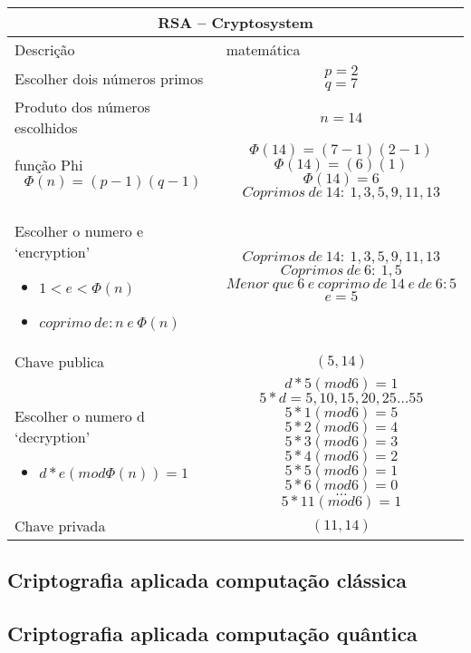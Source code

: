 \vspace{1cm}
\begin{longtable}{ |p{6cm}|| p{8cm}|  }
  \hline
  \multicolumn{2}{|c|}{RSA – Cryptosystem} \\
  \hline
    Descrição & matemática\\
  \hline
    Escolher dois números primos & 
    \[p=2\] \[q=7\]\\
  \hline
    Produto dos números escolhidos & 
    \[n=14\]\\
  \hline
    função Phi 
    \[\Phi(n)=(p-1)(q-1)\] & 
    \[\Phi(14)=(7-1)(2-1)\]
    \[\Phi(14)=(6)(1)\]
    \[\Phi(14)=6\]
    \[Coprimos\: de\: 14:\: 1, 3, 5, 9, 11, 13\]\\
  \hline
    Escolher o numero e `encryption'
    \begin{itemize}
      \item $1 < e < \Phi(n)$
      \item $coprimo\: de: n\: e\: \Phi(n)$
    \end{itemize} &
    \[Coprimos\: de\: 14:\: 1, 3, 5, 9, 11, 13\]
    \[Coprimos\: de\: 6:\: 1, 5\]
    \[Menor\: que\: 6\: e\: coprimo\: de\: 14\: e\: de\: 6: 5\]
    \[e = 5\]\\
  \hline
    Chave publica & 
    \[(5, 14)\]\\
  \hline
  Escolher o numero d `decryption'
    \begin{itemize}
      \item $d * e (mod \Phi(n)) = 1$
    \end{itemize} & 
    \[d * 5 (mod 6) = 1\]
    \[5*d = 5, 10, 15, 20, 25 \dots 55\]
    \[5*1 (mod 6) = 5\]
    \[5*2 (mod 6) = 4\]
    \[5*3 (mod 6) = 3\]
    \[5*4 (mod 6) = 2\]
    \[5*5 (mod 6) = 1\]
    \[5*6 (mod 6) = 0\]
    \[ \dots \]
    \[5*11 (mod 6) = 1\] \\
  \hline
  Chave privada & 
  \[(11, 14)\]\\
\hline
\end{longtable}

\subsection{Criptografia aplicada computação clássica}
\subsection{Criptografia aplicada computação quântica}